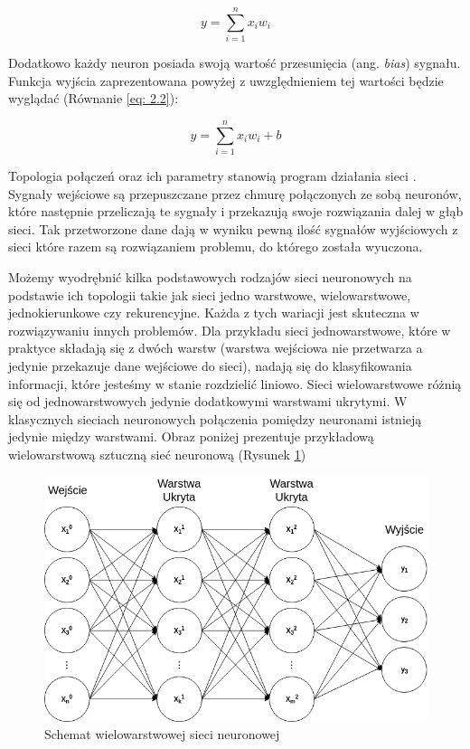 \documentclass[12pt, oneside, a4paper]{report}
\begin{document}
\begin{equation}\label{eq: 2.1}
y = \sum^{n}_{i=1} x_{i}w_{i}
\end{equation}

Dodatkowo każdy neuron posiada swoją wartość przesunięcia (ang. \textit{bias}) sygnału. Funkcja wyjścia zaprezentowana powyżej z uwzględnieniem tej wartości będzie wyglądać (Równanie \ref{eq: 2.2}):

\begin{equation}\label{eq: 2.2}
  y = \sum^{n}_{i=1} x_{i}w_{i} + b
\end{equation}

Topologia połączeń oraz ich parametry stanowią program działania sieci \citep{tadeusiewicz1993sieci}. Sygnały wejściowe są przepuszczane przez chmurę połączonych ze sobą neuronów, które następnie przeliczają te sygnały i przekazują swoje rozwiązania dalej w głąb sieci. Tak przetworzone dane dają w wyniku pewną ilość sygnałów wyjściowych z sieci które razem są rozwiązaniem problemu, do którego została wyuczona.

Możemy wyodrębnić kilka podstawowych rodzajów sieci neuronowych na podstawie ich topologii takie jak sieci jedno warstwowe, wielowarstwowe, jednokierunkowe czy rekurencyjne. Każda z tych wariacji jest skuteczna w rozwiązywaniu innych problemów. Dla przykładu sieci jednowarstwowe, które w praktyce składają się z dwóch warstw (warstwa wejściowa nie przetwarza a jedynie przekazuje dane wejściowe do sieci), nadają się do klasyfikowania informacji, które jesteśmy w stanie rozdzielić liniowo. Sieci wielowarstwowe różnią się od jednowarstwowych jedynie dodatkowymi warstwami ukrytymi. W klasycznych sieciach neuronowych połączenia pomiędzy neuronami istnieją jedynie między warstwami. Obraz poniżej prezentuje przykładową wielowarstwową sztuczną sieć neuronową (Rysunek \ref{fig: 2.2})

\begin{figure}[h]
	\centering
	\includegraphics[width=12cm]{fig212.png}
	\caption{Schemat wielowarstwowej sieci neuronowej}
	\label{fig: 2.2}
\end{figure}
\end{document}
